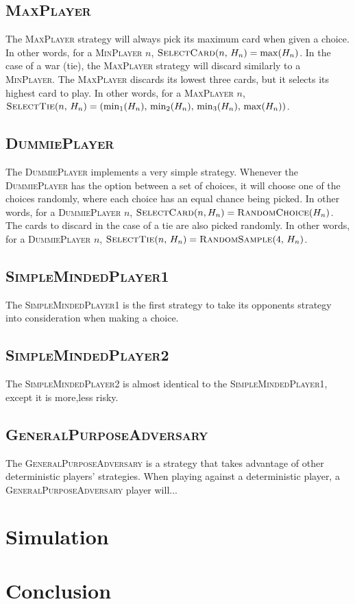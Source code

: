 \documentclass[conference]{IEEEtran}
\newcommand\MinP{\textsc{MinPlayer}}
\newcommand\MaxP{\textsc{MaxPlayer}}
\newcommand\DP{\textsc{DummiePlayer}}
\newcommand\SMPo{\textsc{SimpleMindedPlayer1}}
\newcommand\SMPt{\textsc{SimpleMindedPlayer2}}
\newcommand\GPA{\textsc{GeneralPurposeAdversary}}
\begin{document}
\subsection{\MaxP}
The \MaxP{} strategy will always pick its maximum card when
given a choice. In other words, for a \MinP{} $n$, $\textsc{SelectCard}(n,\,H_n) = \max(H_n)$.
In the case of a war (tie), the \MaxP{} strategy will discard
similarly to a \MinP. The \MaxP{} discards its lowest three cards,
but it selects its highest card to play.
In other words, for a \MaxP{} $n$, $\textsc{SelectTie}(n,\,H_n) = (\min_1(H_n),\,\min_2(H_n),\,\min_3(H_n),\,\max(H_n))$.

\subsection{\DP}
The \DP{} implements a very simple strategy. Whenever the \DP{}
has the option between a set of choices, it will choose one of the choices
randomly, where each choice has an equal chance being picked. In other words,
for a \DP{} $n$, $\textsc{SelectCard}(n, H_n) = \textsc{RandomChoice}(H_n)$.
The cards to discard in the case of a tie are also picked randomly.
In other words, for a \DP{} $n$, $\textsc{SelectTie}(n,\,H_n) = \textsc{RandomSample}(4,\,H_n)$.


\subsection{\SMPo}
The \SMPo{} is the first strategy to take its opponents strategy into consideration when making a choice.

\subsection{\SMPt}
The \SMPt{} is almost identical to the \SMPo, except it is {more,less} risky.

\subsection{\GPA}
The \GPA{} is a strategy that takes advantage of other deterministic players'
strategies. When playing against a deterministic player, a \GPA{} player
will...

\section{Simulation}

\section{Conclusion}
\end{document}
